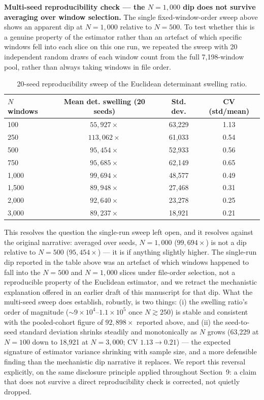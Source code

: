 \documentclass[11pt]{article}
\begin{document}
\textbf{Multi-seed reproducibility check --- the $N=1{,}000$ dip does not survive averaging over window selection.} The single fixed-window-order sweep above shows an apparent dip at $N=1{,}000$ relative to $N=500$. To test whether this is a genuine property of the estimator rather than an artefact of which specific windows fell into each slice on this one run, we repeated the sweep with 20 independent random draws of each window count from the full 7,198-window pool, rather than always taking windows in file order.

\begin{table}[htbp]
\centering
\small
\caption{20-seed reproducibility sweep of the Euclidean determinant swelling ratio.}
\begin{tabular}{lccc}
\toprule
$N$ windows & Mean det. swelling (20 seeds) & Std. dev. & CV (std/mean) \\
\midrule
100 & $55{,}927\times$ & 63,229 & 1.13 \\
250 & $113{,}062\times$ & 61,033 & 0.54 \\
500 & $95{,}454\times$ & 52,933 & 0.56 \\
750 & $95{,}685\times$ & 62,149 & 0.65 \\
1,000 & $99{,}694\times$ & 48,577 & 0.49 \\
1,500 & $89{,}948\times$ & 27,468 & 0.31 \\
2,000 & $92{,}640\times$ & 23,278 & 0.25 \\
3,000 & $89{,}237\times$ & 18,921 & 0.21 \\
\bottomrule
\end{tabular}

\end{table}

This resolves the question the single-run sweep left open, and it resolves against the original narrative: averaged over seeds, $N=1{,}000$ ($99{,}694\times$) is not a dip relative to $N=500$ ($95{,}454\times$) --- it is if anything slightly higher. The single-run dip reported in the table above was an artefact of which windows happened to fall into the $N=500$ and $N=1{,}000$ slices under file-order selection, not a reproducible property of the Euclidean estimator, and we retract the mechanistic explanation offered in an earlier draft of this manuscript for that dip. What the multi-seed sweep does establish, robustly, is two things: (i) the swelling ratio's order of magnitude ($\sim 9\times10^4$--$1.1\times10^5$ once $N \gtrsim 250$) is stable and consistent with the pooled-cohort figure of $92{,}898\times$ reported above, and (ii) the seed-to-seed standard deviation shrinks steadily and monotonically as $N$ grows (63,229 at $N=100$ down to 18,921 at $N=3{,}000$; CV $1.13 \to 0.21$) --- the expected signature of estimator variance shrinking with sample size, and a more defensible finding than the mechanistic dip narrative it replaces. We report this reversal explicitly, on the same disclosure principle applied throughout Section~9: a claim that does not survive a direct reproducibility check is corrected, not quietly dropped.
\end{document}
